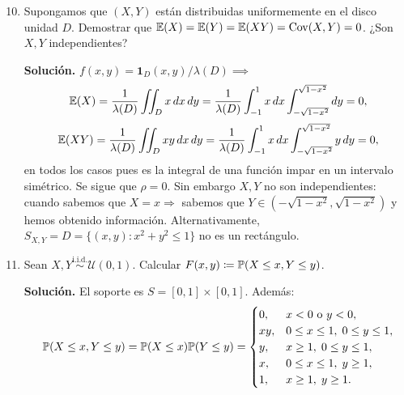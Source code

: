 \begin{enumerate}
  \setcounter{enumi}{9}
  \item Supongamos que $(X, Y)$ están distribuidas uniformemente en el disco unidad $D$. Demostrar que $\mathbb{E}(X) = \mathbb{E}(Y) = \mathbb{E}(XY) = \operatorname{Cov}(X,Y) = 0$. ¿Son $X, Y$ independientes?

  \textbf{Solución.} $f(x,y) = \mathbf{1}_D(x,y)/\lambda(D) \implies$
  \[
    \mathbb{E}(X) = \frac{1}{\lambda(D)}\iint_D x\,dx\,dy = \frac{1}{\lambda(D)}\int_{-1}^1 x\,dx \int_{-\sqrt{1-x^2}}^{\sqrt{1-x^2}} dy = 0,
  \]
  \[
    \mathbb{E}(XY) = \frac{1}{\lambda(D)}\iint_D xy\,dx\,dy = \frac{1}{\lambda(D)}\int_{-1}^1 x\,dx \int_{-\sqrt{1-x^2}}^{\sqrt{1-x^2}} y\,dy = 0,
  \]
  en todos los casos pues es la integral de una función impar en un intervalo simétrico. Se sigue que $\rho = 0$. Sin embargo $X, Y$ no son independientes: cuando sabemos que $X = x \Rightarrow$ sabemos que $Y \in (-\sqrt{1-x^2}, \sqrt{1-x^2})$ y hemos obtenido información. Alternativamente, $S_{X,Y} = D = \{(x,y) : x^2 + y^2 \le 1\}$ no es un rectángulo.

  \item Sean $X, Y \stackrel{\text{i.i.d.}}{\sim} \mathcal{U}(0,1)$. Calcular $F(x,y) \coloneqq \mathbb{P}(X \le x, Y \le y)$.

  \textbf{Solución.} El soporte es $S = [0,1] \times [0,1]$. Además:
  \[
    \mathbb{P}(X \le x, Y \le y) = \mathbb{P}(X \le x)\mathbb{P}(Y \le y) =
    \begin{cases}
      0, & x < 0 \text{ o } y < 0, \\
      xy, & 0 \le x \le 1, \; 0 \le y \le 1, \\
      y, & x \ge 1, \; 0 \le y \le 1, \\
      x, & 0 \le x \le 1, \; y \ge 1, \\
      1, & x \ge 1, \; y \ge 1.
    \end{cases}
  \]
\end{enumerate}
